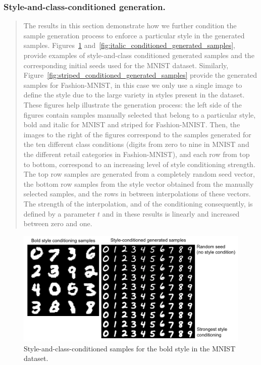 \subsubsection*{Style-and-class-conditioned generation.} 
\begin{quote}
The results in this section demonstrate how we further condition the sample generation process to enforce a particular style in the generated samples. Figures~\ref{fig:bold_conditioned_generated_samples} and~\ref{fig:italic_conditioned_generated_samples}, provide examples of style-and-class conditioned generated samples and the corresponding initial seeds used for the MNIST dataset. Similarly, Figure~\ref{fig:striped_conditioned_generated_samples} provide the generated samples for Fashion-MNIST, in this case we only use a single image to define the style due to the large variety in styles present in the dataset. These figures help illustrate the generation process: the left side of the figures contain samples manually selected that belong to a particular style, bold and italic for MNIST and striped for Fashion-MNIST. Then, the images to the right of the figures correspond to the samples generated for the ten different class conditions (digits from zero to nine in MNIST and the different retail categories in Fashion-MNIST), and each row from top to bottom, correspond to an increasing level of style conditioning strength. The top row samples are generated from a completely random seed vector, the bottom row samples from the style vector obtained from the manually selected samples, and the rows in between interpolations of these vectors. The strength of the interpolation, and of the conditioning consequently, is defined by a parameter $t$ and in these results is linearly and increased between zero and one. 
\end{quote}

\begin{figure}[h!]
    \vskip -0.1in 
    \centering
    \caption{\label{fig:bold_conditioned_generated_samples} Style-and-class-conditioned samples for the bold style in the MNIST dataset.}
    \vspace{-0.1in}
    \includegraphics[width=0.78\columnwidth]{fig_datasynth/bold_conditioned_generated_samples.png} 
\end{figure}

